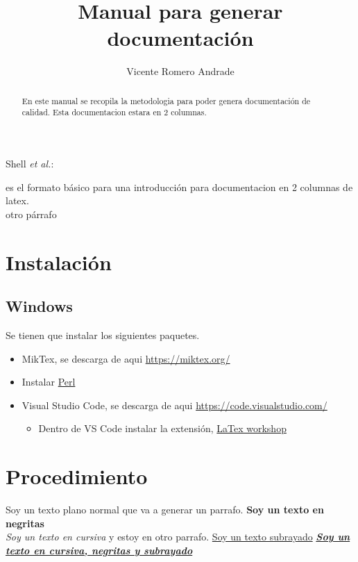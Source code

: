 \documentclass[journal]{IEEEtran}
\begin{document}
\title{Manual para generar documentación}

\author{Vicente Romero Andrade}

{Shell \MakeLowercase{\textit{et al.}}: }

\maketitle

\tableofcontents
\begin{abstract}
En este manual se recopila la metodologia para poder genera documentación de calidad.
Esta documentacion estara en 2 columnas.
\end{abstract}

\IEEEpeerreviewmaketitle


 es el formato básico para una 
introducción para documentacion en 2 columnas de latex.\\otro párrafo

\section{Instalación}
\subsection{Windows}
Se tienen que instalar los siguientes paquetes.
\begin{itemize}
    \item MikTex, se descarga de aqui \url{https://miktex.org/}
    \item Instalar \href{https://www.activestate.com/products/perl/downloads/}{Perl}
    \item Visual Studio Code, se descarga de aqui \url{https://code.visualstudio.com/}
    \begin{itemize}
        \item Dentro de VS Code instalar la extensión, \href{https://marketplace.visualstudio.com/items?itemName=James-Yu.latex-workshop}{LaTex workshop}
    \end{itemize}
\end{itemize}

\section{Procedimiento}
Soy un texto plano normal que va a generar un parrafo. 
\textbf{Soy un texto en negritas}
\\ 
\textit{Soy un texto en cursiva} y estoy en otro parrafo. \underline{Soy un texto subrayado}
\underline{\textit{\textbf{Soy un texto en cursiva, negritas y subrayado}}}  
\end{document}
